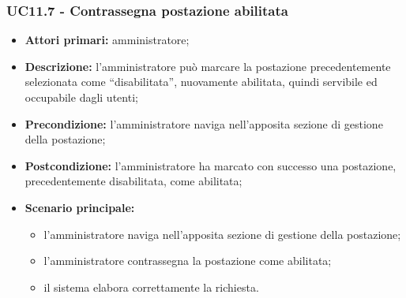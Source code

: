 \subsubsection{UC11.7 - Contrassegna postazione abilitata}

\begin{itemize}
\item \textbf{Attori primari:} amministratore;
\item \textbf{Descrizione:} l’amministratore può marcare la postazione precedentemente selezionata come “disabilitata”, nuovamente abilitata, quindi servibile ed occupabile dagli utenti;
\item \textbf{Precondizione:} l’amministratore naviga nell’apposita sezione di gestione della postazione; 
\item \textbf{Postcondizione:} l’amministratore ha marcato con successo una postazione, precedentemente disabilitata, come abilitata;
\item \textbf{Scenario principale:} 
	\begin{itemize}
		\item l’amministratore naviga nell’apposita sezione di gestione della postazione;
		\item l’amministratore contrassegna la postazione come abilitata;
		\item il sistema elabora correttamente la richiesta.
	\end{itemize}
\end{itemize}
